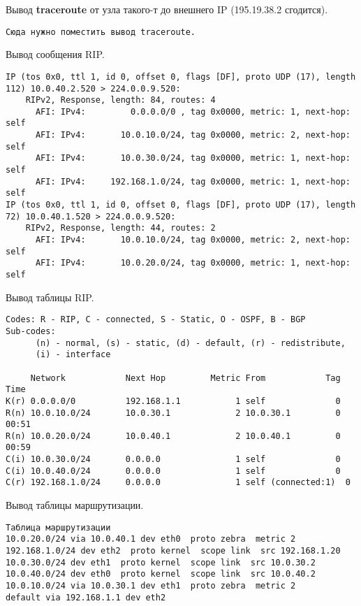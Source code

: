 \documentclass[a4paper,12pt]{article}
\begin{document}
Вывод \textbf{traceroute} от узла такого-т до внешнего IP (195.19.38.2 сгодится).

\begin{Verbatim}
Сюда нужно поместить вывод traceroute.
\end{Verbatim}

Вывод сообщения RIP.

\begin{Verbatim}
IP (tos 0x0, ttl 1, id 0, offset 0, flags [DF], proto UDP (17), length 112) 10.0.40.2.520 > 224.0.0.9.520: 
	RIPv2, Response, length: 84, routes: 4
	  AFI: IPv4:         0.0.0.0/0 , tag 0x0000, metric: 1, next-hop: self
	  AFI: IPv4:       10.0.10.0/24, tag 0x0000, metric: 2, next-hop: self
	  AFI: IPv4:       10.0.30.0/24, tag 0x0000, metric: 1, next-hop: self
	  AFI: IPv4:     192.168.1.0/24, tag 0x0000, metric: 1, next-hop: self
IP (tos 0x0, ttl 1, id 0, offset 0, flags [DF], proto UDP (17), length 72) 10.0.40.1.520 > 224.0.0.9.520: 
	RIPv2, Response, length: 44, routes: 2
	  AFI: IPv4:       10.0.10.0/24, tag 0x0000, metric: 2, next-hop: self
	  AFI: IPv4:       10.0.20.0/24, tag 0x0000, metric: 1, next-hop: self
\end{Verbatim}

Вывод таблицы RIP.

\begin{Verbatim}
Codes: R - RIP, C - connected, S - Static, O - OSPF, B - BGP
Sub-codes:
      (n) - normal, (s) - static, (d) - default, (r) - redistribute,
      (i) - interface

     Network            Next Hop         Metric From            Tag Time
K(r) 0.0.0.0/0          192.168.1.1           1 self              0
R(n) 10.0.10.0/24       10.0.30.1             2 10.0.30.1         0 00:51
R(n) 10.0.20.0/24       10.0.40.1             2 10.0.40.1         0 00:59
C(i) 10.0.30.0/24       0.0.0.0               1 self              0
C(i) 10.0.40.0/24       0.0.0.0               1 self              0
C(r) 192.168.1.0/24     0.0.0.0               1 self (connected:1)  0
\end{Verbatim}

Вывод таблицы маршрутизации.

\begin{Verbatim}
Таблица маршрутизации
10.0.20.0/24 via 10.0.40.1 dev eth0  proto zebra  metric 2 
192.168.1.0/24 dev eth2  proto kernel  scope link  src 192.168.1.20 
10.0.30.0/24 dev eth1  proto kernel  scope link  src 10.0.30.2 
10.0.40.0/24 dev eth0  proto kernel  scope link  src 10.0.40.2 
10.0.10.0/24 via 10.0.30.1 dev eth1  proto zebra  metric 2 
default via 192.168.1.1 dev eth2 
\end{Verbatim}
\end{document}
